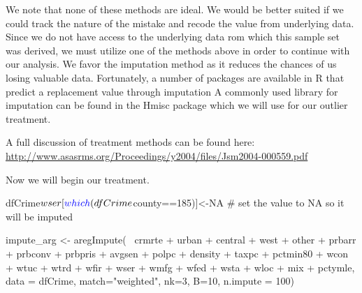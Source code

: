 \documentclass[]{article}
\newenvironment{Shaded}{}{}
\newcommand{\CommentTok}[1]{\textcolor[rgb]{0.00,0.50,0.00}{#1}}
\newcommand{\DataTypeTok}[1]{#1}
\newcommand{\DecValTok}[1]{#1}
\newcommand{\KeywordTok}[1]{\textcolor[rgb]{0.00,0.00,1.00}{#1}}
\newcommand{\NormalTok}[1]{#1}
\newcommand{\OperatorTok}[1]{#1}
\newcommand{\OtherTok}[1]{\textcolor[rgb]{1.00,0.25,0.00}{#1}}
\newcommand{\StringTok}[1]{\textcolor[rgb]{0.00,0.50,0.50}{#1}}
\begin{document}
We note that none of these methods are ideal. We would be better suited
if we could track the nature of the mistake and recode the value from
underlying data. Since we do not have access to the underlying data rom
which this sample set was derived, we must utilize one of the methods
above in order to continue with our analysis. We favor the imputation
method as it reduces the chances of us losing valuable data.
Fortunately, a number of packages are available in R that predict a
replacement value through imputation A commonly used library for
imputation can be found in the Hmisc package which we will use for our
outlier treatment.

A full discussion of treatment methods can be found here:
\url{http://www.asasrms.org/Proceedings/y2004/files/Jsm2004-000559.pdf}

Now we will begin our treatment.

\begin{Shaded}
\begin{Highlighting}[]
\NormalTok{dfCrime}\OperatorTok{$}\NormalTok{wser[}\KeywordTok{which}\NormalTok{(dfCrime}\OperatorTok{$}\NormalTok{county}\OperatorTok{==}\DecValTok{185}\NormalTok{)]<-}\OtherTok{NA} \CommentTok{# set the value to NA so it will be imputed}
\end{Highlighting}
\end{Shaded}

\begin{Shaded}
\begin{Highlighting}[]
\NormalTok{impute_arg <-}\StringTok{ }\KeywordTok{aregImpute}\NormalTok{(}\OperatorTok{~}\StringTok{ }\NormalTok{crmrte }\OperatorTok{+}\StringTok{  }\NormalTok{urban }\OperatorTok{+}\StringTok{ }\NormalTok{central }\OperatorTok{+}\StringTok{ }\NormalTok{west }\OperatorTok{+}\StringTok{ }\NormalTok{other }\OperatorTok{+}
\StringTok{                         }\NormalTok{prbarr }\OperatorTok{+}\StringTok{ }\NormalTok{prbconv }\OperatorTok{+}\StringTok{ }\NormalTok{prbpris }\OperatorTok{+}\StringTok{ }\NormalTok{avgsen }\OperatorTok{+}\StringTok{ }\NormalTok{polpc }\OperatorTok{+}
\StringTok{                         }\NormalTok{density }\OperatorTok{+}\StringTok{ }\NormalTok{taxpc }\OperatorTok{+}\StringTok{ }\NormalTok{pctmin80 }\OperatorTok{+}\StringTok{ }\NormalTok{wcon }\OperatorTok{+}\StringTok{ }\NormalTok{wtuc }\OperatorTok{+}
\StringTok{                         }\NormalTok{wtrd }\OperatorTok{+}\StringTok{ }\NormalTok{wfir }\OperatorTok{+}\StringTok{ }\NormalTok{wser }\OperatorTok{+}\StringTok{ }\NormalTok{wmfg }\OperatorTok{+}\StringTok{ }\NormalTok{wfed }\OperatorTok{+}\StringTok{ }\NormalTok{wsta }\OperatorTok{+}\StringTok{ }\NormalTok{wloc }\OperatorTok{+}
\StringTok{                         }\NormalTok{mix }\OperatorTok{+}\StringTok{ }\NormalTok{pctymle, }\DataTypeTok{data =}\NormalTok{ dfCrime, }\DataTypeTok{match=}\StringTok{"weighted"}\NormalTok{,}
                         \DataTypeTok{nk=}\DecValTok{3}\NormalTok{, }\DataTypeTok{B=}\DecValTok{10}\NormalTok{, }\DataTypeTok{n.impute =} \DecValTok{100}\NormalTok{)}
\end{Highlighting}
\end{Shaded}
\end{document}
